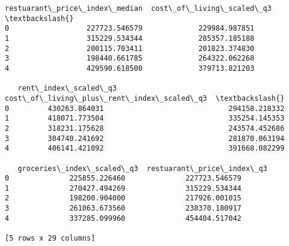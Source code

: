 \documentclass[11pt]{article}
\begin{document}
\begin{Verbatim}[commandchars=\\\{\}]
   restuarant\_price\_index\_median  cost\_of\_living\_scaled\_q3  \textbackslash{}
0                  227723.546579             229984.987851
1                  315229.534344             285357.185188
2                  200115.703411             201823.374830
3                  198440.661785             264322.062268
4                  429590.618500             379713.821203

   rent\_index\_scaled\_q3  cost\_of\_living\_plus\_rent\_index\_scaled\_q3  \textbackslash{}
0         430263.864031                             294158.218332
1         418071.773504                             335254.145353
2         318231.175628                             243574.452686
3         304740.241692                             281870.063194
4         406141.421092                             391668.082299

   groceries\_index\_scaled\_q3  restuarant\_price\_index\_q3
0              225855.226460              227723.546579
1              270427.494269              315229.534344
2              198200.904000              217926.001015
3              261063.673560              238370.180917
4              337285.099960              454404.517042

[5 rows x 29 columns]
    \end{Verbatim}
\end{document}
